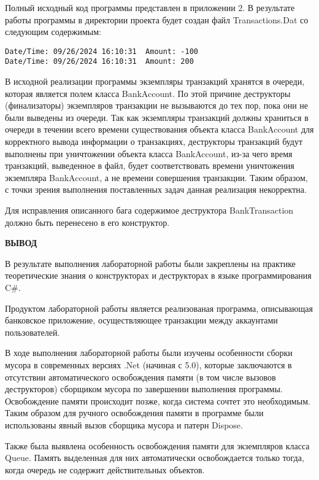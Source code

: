    Полный исходный код программы представлен в приложении 2.
    В результате работы программы в директории проекта будет создан файл Transactions.Dat со следующим содержимым:
\begingroup
\fontsize{12pt}{12pt}\selectfont
\linespread{1.5}
\begin{verbatim}
Date/Time: 09/26/2024 16:10:31	Amount: -100
Date/Time: 09/26/2024 16:10:31	Amount: 200
\end{verbatim}  


\endgroup
    В исходной реализации программы экземпляры транзакций хранятся в очереди, которая является полем класса BankAccount.
    По этой причине деструкторы (финализаторы) экземпляров транзакции не вызываются до тех пор, пока они не были выведены из очереди.
    Так как экземпляры транзакций должны храниться в очереди в течении всего времени существования объекта класса BankAccount для корректного вывода информации о транзакциях, деструкторы транзакций будут выполнены при уничтожении объекта класса BankAccount, из-за чего время транзакций, выведенное в файл, будет соответствовать времени уничтожения экземпляра BankAccount, а не времени совершения транзакции.
    Таким образом, с точки зрения выполнения поставленных задач данная реализация некорректна.
    
    Для исправления описанного бага содержимое деструктора BankTransaction должно быть перенесено в его конструктор.


\newpage
{\bfseries {ВЫВОД}}

В результате выполнения лабораторной работы были закреплены на практике теоретические знания о конструкторах и деструкторах в языке программирования C\#.

Продуктом лабораторной работы является реализованая программа, описывающая банковское приложение, осуществляющее транзакции между аккаунтами пользователей.

В ходе выполнения лабораторной работы были изучены особенности сборки мусора в современных версиях .Net (начиная с 5.0), которые заключаются в отсутствии автоматического освобождения памяти (в том числе вызовов деструкторов) сборщиком мусора по завершении выполнения программы.
Освобождение памяти происходит позже, когда система сочтет это необходимым. 
Таким образом для ручного освобождения памяти в программе были использованы явный вызов сборщика мусора и патерн Dispose.

Также была выявлена особенность освобождения памяти для экземпляров класса Queue. 
Память выделенная для них автоматически освобождается только тогда, когда очередь не содержит действительных объектов.
